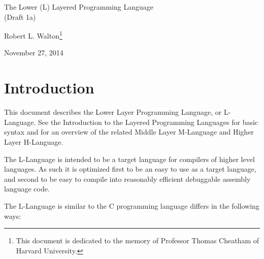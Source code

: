 \documentclass[12pt]{article}
\makeatletter
\renewcommand\tableofcontents{%
    \begin{list}{}%
	     {\setlength{\itemsep}{0in}%
	      \setlength{\topsep}{0in}%
	      \setlength{\parsep}{1ex}%
	      \setlength{\labelwidth}{0in}%
	      \setlength{\baselineskip}{1.5ex}%
	      \setlength{\leftmargin}{1.0in}%
	      \setlength{\rightmargin}{1.0in}}%
    \item\@starttoc{toc}%
    \end{list}}
\makeatother
\begin{document}
        
\begin{center}

{\Large
The Lower (L) Layered Programming Language \\[0.5ex]
(Draft 1a)}

\medskip

Robert L. Walton\footnote{This document is dedicated to the memory
of Professor Thomas Cheatham of Harvard University.}

November 27, 2014
 
\end{center}

{\small \tableofcontents}

\newpage

\section{Introduction}

This document describes the Lower Layer Programming Language, or
L-Language.  See the Introduction to the Layered
Programming Languages for basic syntax and for an overview of the related
Middle Layer M-Language and Higher Layer H-Language.

The L-Language is intended to be a target language for compilers of
higher level languages.  As such it is optimized first to be an easy to 
use as a target language, and second to be easy to
compile into reasonably efficient debuggable assembly language code.

The L-Language is similar to the C programming language
differs in the following ways:
\end{document}
